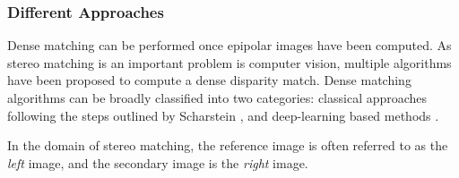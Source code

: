 \subsubsection{Different Approaches}
Dense matching can be performed once epipolar images have been computed. As stereo matching is an important problem is computer vision, multiple algorithms have been proposed to compute a dense disparity match. Dense matching algorithms can be broadly classified into two categories: classical approaches following the steps outlined by Scharstein \etal \cite{scharstein_taxonomy_2001}, and deep-learning based methods \cite{laga_survey_2022}.
\begin{remark}
	In the domain of stereo matching, the reference image is often referred to as the \textit{left} image, and the secondary image is the \textit{right} image.
\end{remark}

